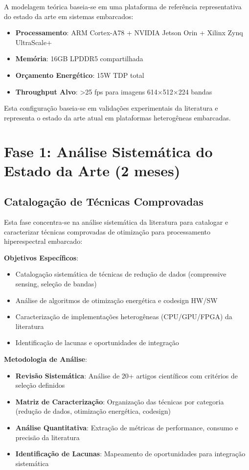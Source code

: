 A modelagem teórica baseia-se em uma plataforma de referência representativa do estado da arte em sistemas embarcados:
\begin{itemize}
\item \textbf{Processamento}: ARM Cortex-A78 + NVIDIA Jetson Orin + Xilinx Zynq UltraScale+
\item \textbf{Memória}: 16GB LPDDR5 compartilhada
\item \textbf{Orçamento Energético}: 15W TDP total
\item \textbf{Throughput Alvo}: >25 fps para imagens 614×512×224 bandas
\end{itemize}

Esta configuração baseia-se em validações experimentais da literatura \cite{diaz2019, hwang2011} e representa o estado da arte atual em plataformas heterogêneas embarcadas.

\section{Fase 1: Análise Sistemática do Estado da Arte (2 meses)}

\subsection{Catalogação de Técnicas Comprovadas}

Esta fase concentra-se na análise sistemática da literatura para catalogar e caracterizar técnicas comprovadas de otimização para processamento hiperespectral embarcado:

\textbf{Objetivos Específicos}:
\begin{itemize}
\item Catalogação sistemática de técnicas de redução de dados (compressive sensing, seleção de bandas)
\item Análise de algoritmos de otimização energética e codesign HW/SW
\item Caracterização de implementações heterogêneas (CPU/GPU/FPGA) da literatura
\item Identificação de lacunas e oportunidades de integração
\end{itemize}

\textbf{Metodologia de Análise}:
\begin{itemize}
\item \textbf{Revisão Sistemática}: Análise de 20+ artigos científicos com critérios de seleção definidos
\item \textbf{Matriz de Caracterização}: Organização das técnicas por categoria (redução de dados, otimização energética, codesign)
\item \textbf{Análise Quantitativa}: Extração de métricas de performance, consumo e precisão da literatura
\item \textbf{Identificação de Lacunas}: Mapeamento de oportunidades para integração sistemática
\end{itemize}

